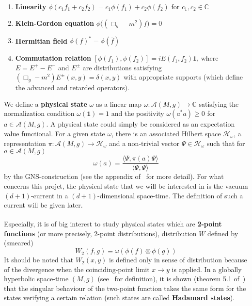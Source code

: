 \begin{enumerate}
\item \textbf{Linearity} $\phi(c_1 f_1 + c_2 f_2) = c_1 \phi(f_1) + c_2 \phi(f_2)$ for $c_1, c_2 \in \mathbb{C}$
%
\item \textbf{Klein-Gordon equation} $\phi\big( (\Box_g - m^2)f \big) = 0$
%
\item \textbf{Hermitian field} $\phi(f)^* = \phi(\bar{f})$
%
\item \textbf{Commutation relation} $[\phi(f_1), \phi(f_2)] = iE(f_1, f_2) \mathbf{1}$, where $E = E^+ - E^-$ and $E^\pm$ are distributions satisfying $(\Box_g - m^2)E^\pm(x,y) = \delta(x,y)$ with appropriate supports (which define the advanced and retarded operators).
\end{enumerate}
%
We define a \textbf{physical state} $\omega$ as a linear map
$\omega: \mathscr{A}(M,g) \rightarrow \mathbb{C}$ satisfying the normalization condition $\omega(\mathbf{1}) = 1$ and the positivity $\omega(a^*a) \geq 0$ for $a\in\mathscr{A}(M,g)$.
A physical state could simply be considered as an expectation value functional. 
For a given state $\omega$, there is an associated Hilbert space $\mathscr{H}_\omega$, a representation $\pi : \mathscr{A}(M,g)\rightarrow \mathscr{H}_\omega$ and a non-trivial vector $\Psi \in \mathscr{H}_\omega$ such that for $a \in \mathscr{A}(M,g)$
\begin{equation*}
\omega(a) = \frac{\langle \Psi, \pi(a)\Psi\rangle}{\langle \Psi, \Psi \rangle}
\end{equation*}
by the GNS-construction (see \eg the appendix of~\cite{Timmermann2008} for more detail).
For what concerns this projet, the physical state that we will be interested in is the vacuum $(d+1)$-current in a $(d+1)$-dimensional space-time.
The definition of such a current will be given later. \\\\
%
Especially, it is of big interest to study physical states which are \textbf{2-point functions} (or more precisely, 2-point distributions), 
\ie distribution $W$ defined by (smeared) 
\begin{equation*}
W_2(f, g ) \equiv \omega(\phi(f)\otimes \phi(g))
\end{equation*}
It should be noted that $W_2(x,y)$ is defined only in sense of distribution because of the divergence when the coinciding-point limit $x\rightarrow y$ is applied.
In a globally hyperbolic space-time $(M,g)$ (see~\cite{Wald2010} for definition), it is shown (theorem 5.1 of~\cite{Radzikowski1996}) that the singular behaviour of the two-point function takes the same form for the states verifying a certain relation (such states are called \textbf{Hadamard states}). 
